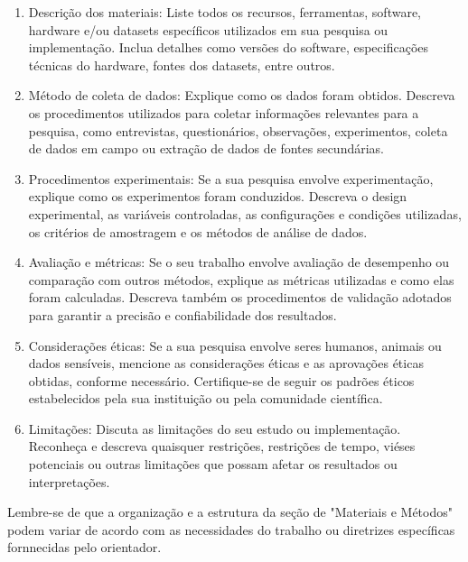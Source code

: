 \documentclass[12pt,a4paper, brazil]{article}
\begin{document}
\begin{enumerate}
    \item Descrição dos materiais: Liste todos os recursos, ferramentas, software, hardware e/ou datasets específicos utilizados em sua pesquisa ou implementação. Inclua detalhes como versões do software, especificações técnicas do hardware, fontes dos datasets, entre outros. 

    \item Método de coleta de dados: Explique como os dados foram obtidos. Descreva os procedimentos utilizados para coletar informações relevantes para a pesquisa, como entrevistas, questionários, observações, experimentos, coleta de dados em campo ou extração de dados de fontes secundárias.
    
    \item Procedimentos experimentais: Se a sua pesquisa envolve experimentação, explique como os experimentos foram conduzidos. Descreva o design experimental, as variáveis controladas, as configurações e condições utilizadas, os critérios de amostragem e os métodos de análise de dados.

    \item Avaliação e métricas: Se o seu trabalho envolve avaliação de desempenho ou comparação com outros métodos, explique as métricas utilizadas e como elas foram calculadas. Descreva também os procedimentos de validação adotados para garantir a precisão e confiabilidade dos resultados.
    
    \item Considerações éticas: Se a sua pesquisa envolve seres humanos, animais ou dados sensíveis, mencione as considerações éticas e as aprovações éticas obtidas, conforme necessário. Certifique-se de seguir os padrões éticos estabelecidos pela sua instituição ou pela comunidade científica.
    
    \item Limitações: Discuta as limitações do seu estudo ou implementação. Reconheça e descreva quaisquer restrições, restrições de tempo, viéses potenciais ou outras limitações que possam afetar os resultados ou interpretações.

\end{enumerate}

Lembre-se de que a organização e a estrutura da seção de "Materiais e Métodos" podem variar de acordo com as necessidades do trabalho ou diretrizes específicas fornnecidas pelo orientador.




\printbibliography
\end{document}

